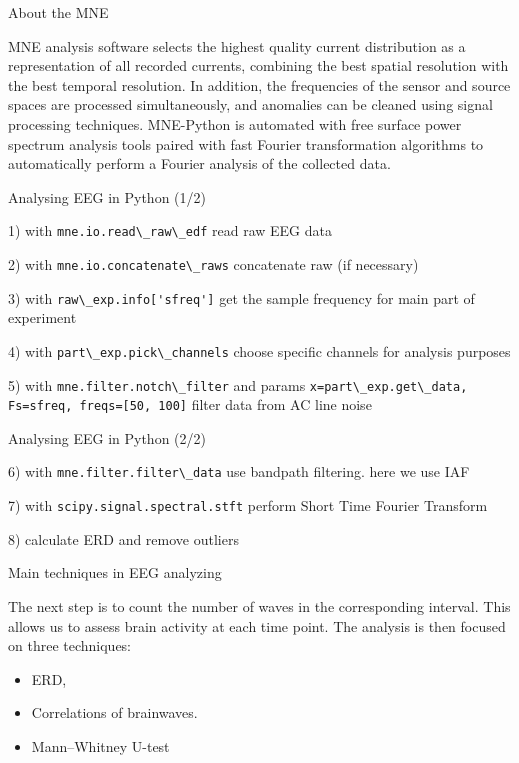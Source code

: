 \documentclass{beamer}
\begin{document}
\begin{frame}
{\centerline{About the MNE}}
    MNE analysis software selects the highest quality current distribution as a representation of all recorded currents, combining the best spatial resolution with the best temporal resolution. In addition, the frequencies of the sensor and source spaces are processed simultaneously, and anomalies can be cleaned using signal processing techniques. MNE-Python is automated with free surface power spectrum analysis tools paired with fast Fourier transformation algorithms to automatically perform a Fourier analysis of the collected data.
\end{frame}

\begin{frame}
{\centerline{Analysing EEG in Python (1/2)}}

1) with \verb|mne.io.read\_raw\_edf| read raw EEG data

2) with \verb|mne.io.concatenate\_raws| concatenate raw (if necessary)

3) with \verb|raw\_exp.info['sfreq']| get the sample frequency for main part of experiment

4) with \verb|part\_exp.pick\_channels| choose specific channels for analysis purposes

5) with \verb|mne.filter.notch\_filter| and params \verb|x=part\_exp.get\_data, Fs=sfreq, freqs=[50, 100]| filter data from AC line noise
    
\end{frame}

\begin{frame}
{\centerline{Analysing EEG in Python (2/2)}}

6) with \verb|mne.filter.filter\_data| use bandpath filtering. here we use IAF

7) with \verb|scipy.signal.spectral.stft| perform Short Time Fourier Transform

8) calculate ERD and remove outliers
    
\end{frame}

\begin{frame}
{\centerline{Main techniques in EEG analyzing}}
The next step is to count the number of waves in the corresponding interval. This allows us to assess brain activity at each time point. The analysis is then focused on three techniques:
\begin{itemize}
    \item ERD,
    \item Correlations of brainwaves.
    \item Mann–Whitney U-test
\end{itemize}
\end{frame}
\end{document}
